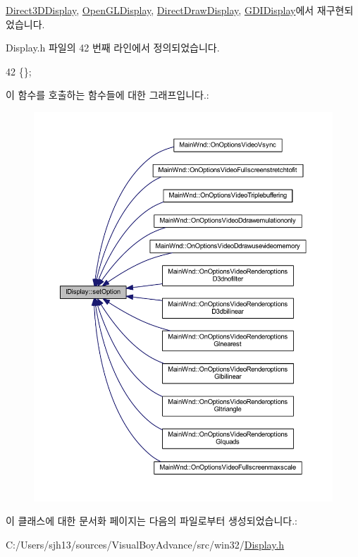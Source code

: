 \mbox{\hyperlink{class_direct3_d_display_a9fb19225514b70c7178aa871c9852936}{Direct3\+D\+Display}}, \mbox{\hyperlink{class_open_g_l_display_ad92750f75fabf5873f8626cb154f29b9}{Open\+G\+L\+Display}}, \mbox{\hyperlink{class_direct_draw_display_a94010855bad5354842c7c7062ab4ce03}{Direct\+Draw\+Display}}, \mbox{\hyperlink{class_g_d_i_display_a4e8f52858b49c9132c77c2f14b13bead}{G\+D\+I\+Display}}에서 재구현되었습니다.



Display.\+h 파일의 42 번째 라인에서 정의되었습니다.


\begin{DoxyCode}
42 \{\};
\end{DoxyCode}
이 함수를 호출하는 함수들에 대한 그래프입니다.\+:
\nopagebreak
\begin{figure}[H]
\begin{center}
\leavevmode
\includegraphics[width=350pt]{class_i_display_a1766244708c252bb8781892c76c20ba9_icgraph}
\end{center}
\end{figure}


이 클래스에 대한 문서화 페이지는 다음의 파일로부터 생성되었습니다.\+:\begin{DoxyCompactItemize}
\item 
C\+:/\+Users/sjh13/sources/\+Visual\+Boy\+Advance/src/win32/\mbox{\hyperlink{_display_8h}{Display.\+h}}\end{DoxyCompactItemize}
